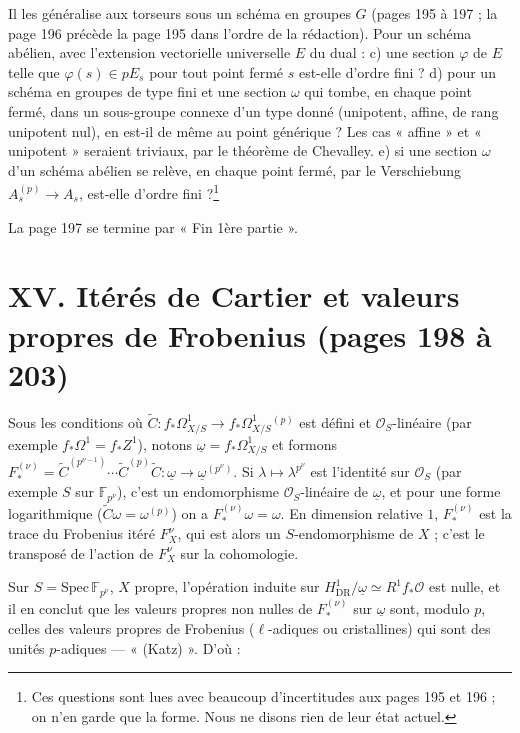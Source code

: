 \documentclass[11pt,a4paper]{article}
\begin{document}
Il les généralise aux torseurs sous un schéma en groupes $G$ (pages 195 à
197 ; la page 196 précède la page 195 dans l'ordre de la rédaction). Pour un
schéma abélien, avec l'extension vectorielle universelle $E$ du dual : c)
une section $\varphi$ de $E$ telle que $\varphi(s) \in pE_s$ pour tout point
fermé $s$ est-elle d'ordre fini ? d) pour un schéma en groupes de type fini
et une section $\omega$ qui tombe, en chaque point fermé, dans un sous-groupe
connexe d'un type donné (unipotent, affine, de rang unipotent nul), en
est-il de même au point générique ? Les cas « affine » et « unipotent »
seraient triviaux, par le théorème de Chevalley. e) si une section $\omega$
d'un schéma abélien se relève, en chaque point fermé, par le Verschiebung
$A_s^{(p)} \to A_s$, est-elle d'ordre fini ?\footnote{Ces questions sont lues
avec beaucoup d'incertitudes aux pages 195 et 196 ; on n'en garde que la
forme. Nous ne disons rien de leur état actuel.}

La page 197 se termine par « Fin 1ère partie ».

\section*{XV. Itérés de Cartier et valeurs propres de Frobenius (pages 198 à 203)}

Sous les conditions où $\widetilde C : f_*\Omega^1_{X/S} \to f_*\Omega^1_{X/S}{}^{(p)}$
est défini et $\mathcal{O}_S$-linéaire (par exemple $f_*\Omega^1 = f_*Z^1$),
notons $\underline{\omega} = f_*\Omega^1_{X/S}$ et formons
$F_*^{(\nu)} = \widetilde C^{(p^{\nu-1})} \cdots \widetilde C^{(p)}\widetilde C :
\underline\omega \to \underline\omega^{(p^\nu)}$. Si $\lambda \mapsto \lambda^{p^\nu}$
est l'identité sur $\mathcal{O}_S$ (par exemple $S$ sur $\mathbb{F}_{p^\nu}$), c'est
un endomorphisme $\mathcal{O}_S$-linéaire de $\underline\omega$, et pour une forme
logarithmique ($\widetilde C\omega = \omega^{(p)}$) on a $F_*^{(\nu)}\omega =
\omega$. En dimension relative $1$, $F_*^{(\nu)}$ est la trace du Frobenius
itéré $F^\nu_X$, qui est alors un $S$-endomorphisme de $X$ ; c'est le transposé
de l'action de $F^\nu_X$ sur la cohomologie.

Sur $S = \mathrm{Spec}\,\mathbb{F}_{p^\nu}$, $X$ propre, l'opération induite sur
$H^1_{\mathrm{DR}}/\underline\omega \simeq R^1f_*\mathcal{O}$ est nulle, et il en
conclut que les valeurs propres non nulles de $F_*^{(\nu)}$ sur
$\underline\omega$ sont, modulo $p$, celles des valeurs propres de Frobenius
($\ell$-adiques ou cristallines) qui sont des unités $p$-adiques —
« (Katz) ». D'où :
\end{document}
